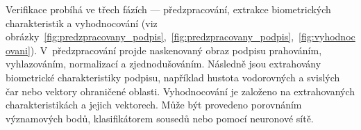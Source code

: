 Verifikace probíhá ve třech fázích --- předzpracování, extrakce biometrických charakteristik a vyhodnocování (viz obrázky~\ref{fig:predzpracovany_podpis},~\ref{fig:predzpracovany_podpis},~\ref{fig:vyhodnocovani}). %
V~předzpracování projde naskenovaný obraz podpisu prahováním, vyhlazováním, normalizací a zjednodušováním.    %
Následně jsou extrahovány biometrické charakteristiky podpisu,                                                %
například hustota vodorovných a svislých čar nebo vektory ohraničené oblasti.                                 %
Vyhodnocování je založeno na extrahovaných charakteristikách a jejich vektorech.                              %
Může být provedeno porovnáním významových bodů, klasifikátorem sousedů nebo  pomocí neuronové sítě.\cite{RakRoman2008}%

